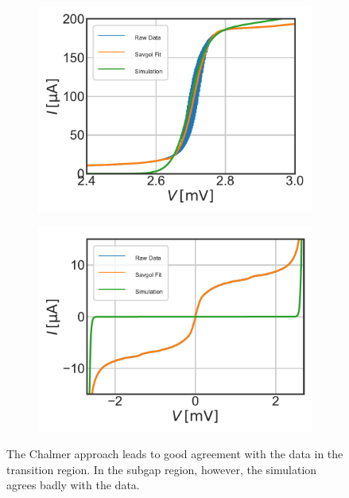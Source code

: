 \documentclass[]{article}
\begin{document}
\begin{figure}
	\centering              
	\begin{subfigure}[t]{0.49\textwidth}
		\centering
		\includegraphics[width=\linewidth]{./../IV_Class_Unit_Test/2020_01_14/Simulation_Chalmers_Transission.pdf}
	\end{subfigure}
	\begin{subfigure}[t]{0.49\textwidth}
		\centering
		\includegraphics[width=\linewidth]{./../IV_Class_Unit_Test/2020_01_14/Simulation_Chalmers_Subgap.pdf}
	\end{subfigure}
	\caption[]{The Chalmer approach leads to good agreement with the data in the transition region. In the subgap region, however, the simulation agrees badly with the data.
	}
	\label{fig:Chalmers}
\end{figure}
\end{document}
